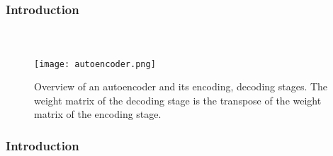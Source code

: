
\begin{frame}[t]
	\frametitle{Introduction}
	\framesubtitle{~~}  %

\begin{figure}[h]
	\centering
	\texttt{[image: autoencoder.png]}
	\caption{Overview of an autoencoder and its encoding, decoding stages. The weight matrix of the decoding stage is the transpose of the weight matrix of the encoding stage.}
	\label{fig:autoencoder}
\end{figure}


\end{frame}
\begin{frame}[t]
	\frametitle{Introduction}
	\framesubtitle{~~}  %

\end{frame}


